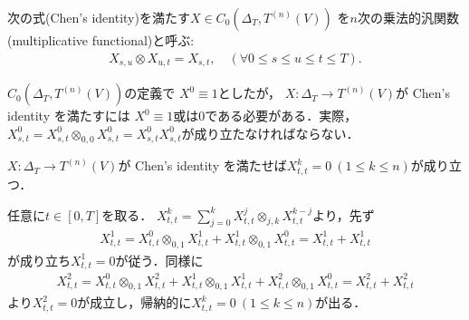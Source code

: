 	\begin{screen}
		\begin{dfn}[乗法的汎関数]
			次の式(Chen's identity)を満たす$X \in C_0 \left(\Delta_T,T^{(n)}(V) \right)$
			を$n$次の乗法的汎関数(multiplicative functional)と呼ぶ:
			\begin{align}
				X_{s,u} \otimes X_{u,t} = X_{s,t},
				\quad (\forall 0 \leq s \leq u \leq t \leq T).
			\end{align}
		\end{dfn}
	\end{screen}
	
	$C_0 \left(\Delta_T,T^{(n)}(V) \right)$の定義で
	$X^0 \equiv 1$としたが，
	$X:\Delta_T \longrightarrow T^{(n)}(V)$が Chen's identity を満たすには
	$X^0 \equiv 1$或は0である必要がある．実際，
	$X^0_{s,t} = X^0_{s,t} \otimes_{0,0} X^0_{s,t} = X^0_{s,t}X^0_{s,t}$が成り立たなければならない．
	
	\begin{screen}
		\begin{lem}
			$X:\Delta_T \longrightarrow T^{(n)}(V)$が
			Chen's identity を満たせば$X^k_{t,t} = 0\ (1 \leq k \leq n)$が成り立つ．
		\end{lem}
	\end{screen}
	
	\begin{prf}
		任意に$t \in [0,T]$を取る．
		$X^k_{t,t} = \sum_{j=0}^{k} X^j_{t,t} \otimes_{j,k} X^{k-j}_{t,t}$より，先ず
		\begin{align}
			X^1_{t,t} = X^0_{t,t} \otimes_{0,1} X^1_{t,t} + X^1_{t,t} \otimes_{0,1} X^0_{t,t}
			= X^1_{t,t} + X^1_{t,t}
		\end{align}
		が成り立ち$X^1_{t,t} = 0$が従う．同様に
		\begin{align}
			X^2_{t,t} = X^0_{t,t} \otimes_{0,1} X^2_{t,t} + X^1_{t,t} \otimes_{0,1} X^1_{t,t}
				+ X^2_{t,t} \otimes_{0,1} X^0_{t,t}
			= X^2_{t,t} + X^2_{t,t}
		\end{align}
		より$X^2_{t,t} = 0$が成立し，帰納的に$X^k_{t,t} = 0\ (1 \leq k \leq n)$が出る．
		\QED
	\end{prf}
	
	\begin{screen}
		\begin{thm}
		\end{thm}
	\end{screen}
	
